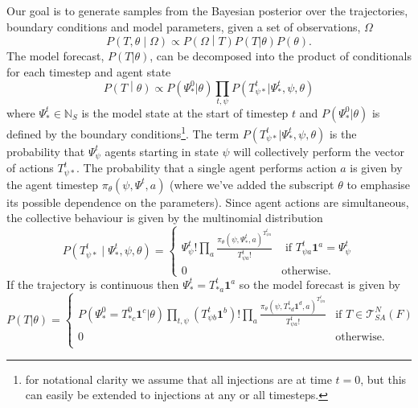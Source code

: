 \documentclass{article}
\begin{document}
Our goal is to generate samples from the Bayesian posterior over the trajectories, boundary conditions and model parameters, given a set of observations, $\Omega$
\[
P\left(T,\theta \middle| \Omega\right) \propto P\left(\Omega \middle| T\right)P(T|\theta)P(\theta).
\]
The model forecast, $P(T|\theta)$, can be decomposed into the product of conditionals for each timestep and agent state
\[
P\left(T \middle| \theta \right) \propto  P(\Psi^0_*|\theta) \prod_{t,\psi} P(T^t_{\psi *} | \Psi^t_*,\psi,\theta)
\]
where $\Psi^t_* \in\mathbb{N}_S$ is the model state at the start of timestep $t$ and $P(\Psi^0_*|\theta)$ is defined by the boundary conditions\footnote{for notational clarity we assume that all injections are at time $t=0$, but this can easily be extended to injections at any or all timesteps.}.  The term $P(T^t_{\psi *} | \Psi^t_*,\psi,\theta)$ is the probability that $\Psi^t_\psi$ agents starting in state $\psi$ will collectively perform the vector of actions $T^t_{\psi *}$. The probability that a single agent performs action $a$ is given by the agent timestep $\pi_\theta(\psi,\Psi^t,a)$ (where we've added the subscript $\theta$ to emphasise its possible dependence on the parameters). Since agent actions are simultaneous, the collective behaviour is given by the multinomial distribution
\begin{equation}
P\left(T^t_{\psi *} \mid \Psi^t_*, \psi, \theta\right) = 
\begin{cases}
\Psi^t_\psi!\prod_a \frac{\pi_\theta(\psi,\Psi^t_*,a)^{T^t_{\psi a}}}{T^t_{\psi a}!} & \text{ if } T^t_{\psi a}\mathbf{1}^a = \Psi^t_\psi \\
0 & \text{otherwise.}
\end{cases}
\end{equation}
If the trajectory is continuous then $\Psi^t_* = T^t_{* a}\mathbf{1}^a$ so the model forecast is given by 
\begin{equation}
P(T|\theta) =
\begin{cases}
P(\Psi^0_* = T^0_{* c}\mathbf{1}^c|\theta)
\prod_{t, \psi} \left(T^t_{\psi b} \mathbf{1}^b \right)!
\prod_{a} \frac{\pi_\theta(\psi, T^{t}_{* d}\mathbf{1}^d,a)^{T^{t}_{\psi a}}}{T^{t}_{\psi a}!} & \text{if } T \in \mathcal{T}^N_{SA}(F) \\
0 & \text{otherwise.}\\
\end{cases}
\label{priorTrajectory}
\end{equation}
\end{document}
